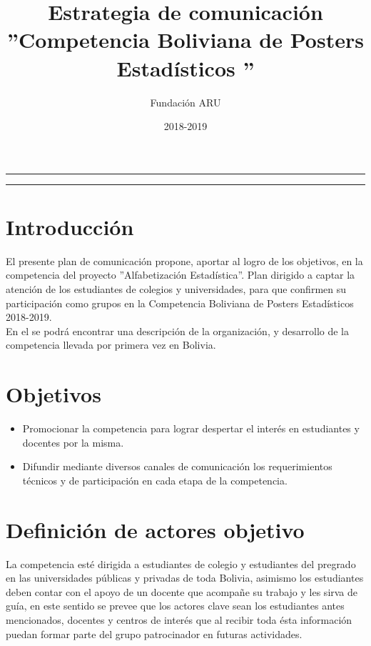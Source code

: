 \documentclass{article}
\title{\textbf{Estrategia de comunicación} \\ ''Competencia Boliviana de Posters Estadísticos ''}
\author{Fundación ARU}
\date{2018-2019 }
\begin{document}
\maketitle

\hrule
\hrule
\newpage

\section{Introducción}

El presente plan de comunicación propone, aportar al logro de los objetivos, en la competencia del proyecto ''Alfabetización Estadística''. Plan dirigido a captar la atención de los estudiantes de colegios y universidades, para que confirmen su participación como grupos en la Competencia Boliviana de Posters Estadísticos 2018-2019.\\

En el se podrá encontrar una descripción de la organización, y desarrollo de la competencia llevada por primera vez en Bolivia.


\section{Objetivos}


\begin{itemize}
\item Promocionar la competencia para lograr despertar el interés en estudiantes y docentes por la misma. 

\item Difundir mediante diversos canales de comunicación los requerimientos técnicos y de participación en cada etapa de la competencia.
\end{itemize} 

\section{Definición de actores objetivo}


La competencia esté dirigida a estudiantes de colegio y estudiantes del pregrado en las universidades públicas y privadas de toda Bolivia, asimismo los estudiantes deben contar con el apoyo de un docente que acompañe su trabajo y les sirva de guía, en este sentido se prevee que los actores clave sean los estudiantes antes mencionados, docentes y centros de interés que al recibir toda ésta información puedan formar parte del grupo patrocinador en futuras actividades.
\end{document}
